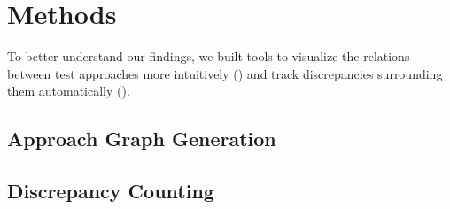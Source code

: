 \section{Methods}
\label{methods}

To better understand our findings, we built tools to visualize the
relations between test approaches more intuitively () and track
discrepancies surrounding them automatically ().

\subsection{Approach Graph Generation}
\label{graph-gen}

\graphGenDesc{}

\subsection{Discrepancy Counting}
\label{discrep-count}
